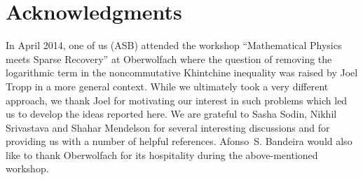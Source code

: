 \documentclass[aop,MSNbibl,dvips]{arximspdf}
\begin{document}
\section*{Acknowledgments}
In April 2014, one of us (ASB) attended the workshop ``Mathematical
Physics meets Sparse Recovery'' at Oberwolfach where the question of
removing the logarithmic term in the noncommutative Khintchine
inequality was raised by Joel Tropp in a more general context. While we
ultimately took a very different approach, we thank Joel for
motivating our interest in such problems which led us to develop the
ideas reported here. We are grateful to Sasha Sodin, Nikhil Srivastava
and Shahar Mendelson for several interesting discussions and for
providing us with a number of helpful references.
Afonso~S. Bandeira would also
like to thank Oberwolfach for its hospitality during the above-mentioned
workshop.

\end{document}
